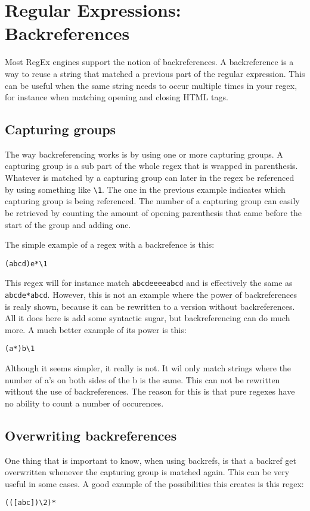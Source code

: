 \section{Regular Expressions: Backreferences}

Most RegEx engines support the notion of backreferences. A backreference is a
way to reuse a string that matched a previous part of the regular expression.
This can be useful when the same string needs to occur multiple times in your
regex, for instance when matching opening and closing HTML tags.

\subsection{Capturing groups}

The way backreferencing works is by using one or more capturing groups.
A capturing group is a sub part of the whole regex that is wrapped in
parenthesis. Whatever is matched by a capturing group can later in the regex be
referenced by using something like \verb|\1|. The one in the previous example
indicates which capturing group is being referenced. The number of a capturing
group can easily be retrieved by counting the amount of opening parenthesis
that came before the start of the group and adding one.

The simple example of a regex with a backrefence is this:

\begin{verbatim}
(abcd)e*\1
\end{verbatim}

This regex will for instance match \verb|abcdeeeeabcd| and is effectively the same
as \verb|abcde*abcd|. However, this is not an example where the power of
backreferences is realy shown, because it can be rewritten to a version
without backreferences. All it does here is add some syntactic sugar, but
backreferencing can do much more. A much better example of its power is this:
\begin{verbatim}
(a*)b\1
\end{verbatim}
Although it seems simpler, it really is not. It wil only match strings where
the number of a's on both sides of the b is the same. This can not be rewritten
without the use of backreferences. The reason for this is that pure regexes
have no ability to count a number of occurences.


\subsection{Overwriting backreferences}
One thing that is important to know, when using backrefs, is that a backref get
overwritten whenever the capturing group is matched again. This can be very
useful in some cases. A good example of the possibilities this creates is this
regex:
\begin{verbatim}
(([abc])\2)*
\end{verbatim}

